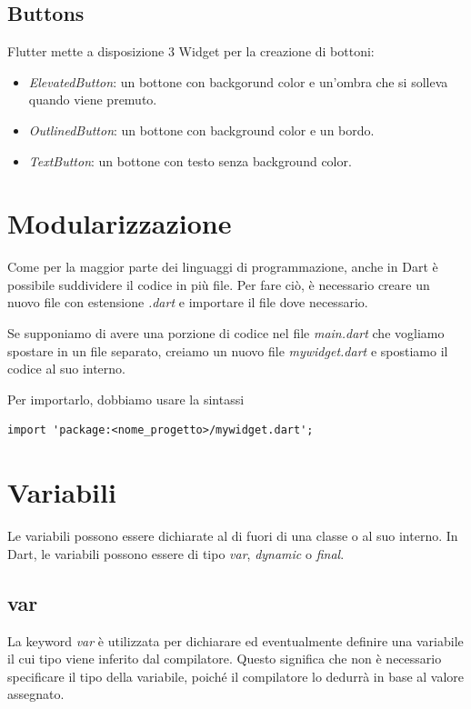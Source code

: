 \documentclass[12pt]{article}
\begin{document}
\subsection{Buttons}
Flutter mette a disposizione 3 Widget per la creazione di bottoni:
\begin{itemize}
    \item \textit{ElevatedButton}: un bottone con backgorund color e un'ombra che si solleva quando viene premuto.
    \item \textit{OutlinedButton}: un bottone con background color e un bordo.
    \item \textit{TextButton}: un bottone con testo senza background color.
\end{itemize}





\section{Modularizzazione}
Come per la maggior parte dei linguaggi di programmazione,
anche in Dart è possibile suddividere il codice in più file.
Per fare ciò, è necessario creare un nuovo file con estensione \textit{.dart}
e importare il file dove necessario.

Se supponiamo di avere una porzione di codice nel file
\textit{main.dart} che vogliamo spostare in un file separato,
creiamo un nuovo file \textit{mywidget.dart} e spostiamo il codice
al suo interno.

Per importarlo, dobbiamo usare la sintassi
\begin{highlight}
\begin{verbatim}
import 'package:<nome_progetto>/mywidget.dart';
\end{verbatim}
\end{highlight}


\section{Variabili}
Le variabili possono essere dichiarate al di fuori di una classe o al
suo interno.
In Dart, le variabili possono essere di tipo \textit{var}, \textit{dynamic} o \textit{final}.

\subsection{var}
La keyword \textit{var} è utilizzata per dichiarare ed
eventualmente definire una variabile il cui tipo
viene inferito dal compilatore. Questo significa che non è necessario specificare
il tipo della variabile, poiché il compilatore lo dedurrà in base al valore assegnato.
\end{document}
